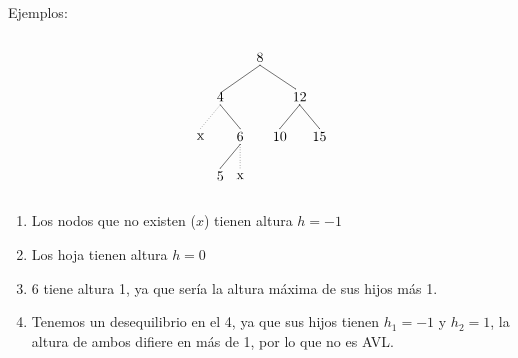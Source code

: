 \documentclass[10pt,a4paper,spanish]{report}
\begin{document}
\noindent
Ejemplos:

\begin{minipage}{0.6\textwidth}
\[\begin{xy}
,(0,0)*+=<10mm>[]\txt<2cm>{8}
,(-10,-10)*+=<10mm>[]\txt<2cm>{4}
,(10,-10)*+=<10mm>[]\txt<2cm>{12}
,(-15,-20)*+=<10mm>[]\txt<2cm>{x}
,(-5,-20)*+=<10mm>[]\txt<2cm>{6}
,(5,-20)*+=<10mm>[]\txt<2cm>{10}
,(15,-20)*+=<10mm>[]\txt<2cm>{15}
,(-10,-30)*+=<10mm>[]\txt<2cm>{5}
,(-5,-30)*+=<10mm>[]\txt<2cm>{x}

\ar@{-} (0,-2);(-10,-9) %
\ar@{-} (0,-2);(9,-8) %
\ar@{.} (-10,-12);(-15,-18) %
\ar@{-} (10,-12);(5,-18) %
\ar@{-} (10,-12);(15,-18) %
\ar@{-} (-10,-12);(-5,-18) %
\ar@{-} (-5,-22);(-10,-28) %
\ar@{.} (-5,-22);(-5,-28) %
\end{xy}\]
\end{minipage}
\begin{minipage}{0.6\textwidth}
\begin{enumerate}[$\bigstar$]
      \item Los nodos que no existen ($x$) tienen altura $h=-1$
      \item Los hoja tienen altura $h=0$
      \item 6 tiene altura 1, ya que sería la altura máxima de sus hijos más 1.
      \item Tenemos un desequilibrio en el 4, ya que sus hijos tienen $h_1 = -1$ y $h_2 = 1$, la altura de ambos difiere en más de 1, por lo que no es AVL.
\end{enumerate}
\end{minipage}
\end{document}
